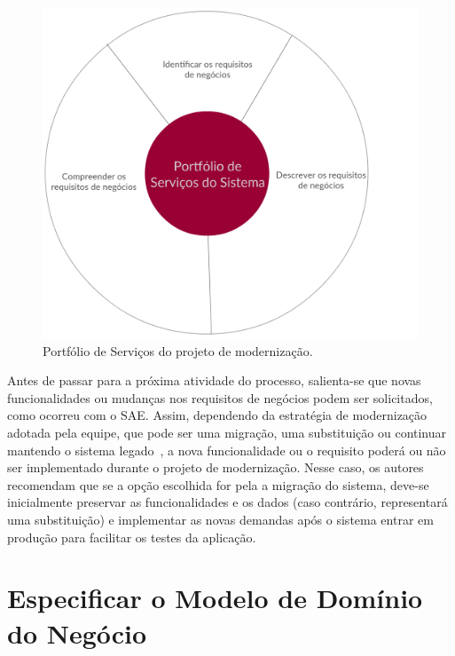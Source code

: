 \begin{figure}[htb]
\centering
\includegraphics[scale=0.30]{img/processo/portfolio_servicos.pdf}
\caption{Portfólio de Serviços do projeto de modernização.}
\label{fig:portfolio_servicos}
\end{figure}


Antes de passar para a próxima atividade do processo, 
salienta-se que novas
funcionalidades ou mudanças nos requisitos de negócios 
podem ser solicitados,
como ocorreu com o \acrshort{SAE}. 
Assim, 
dependendo da estratégia de modernização
adotada pela equipe, que pode ser uma migração, 
uma substituição ou 
continuar mantendo 
o sistema legado~\cite{S3_Bisbal:1999, Seacord:2003, S12_WeidermanApproaches:1997}, 
a nova funcionalidade ou o requisito
poderá ou não ser implementado
durante o projeto de modernização.
Nesse caso, os autores~\cite{S3_Bisbal:1999, Seacord:2003}
recomendam que se a opção escolhida for pela a migração do sistema, 
deve-se inicialmente preservar as funcionalidades e 
os dados (caso contrário, representará uma substituição)
e implementar as novas demandas após 
o sistema entrar em produção para facilitar os testes da aplicação.










\section{Especificar o Modelo de Domínio do Negócio}\label{pro:esp_modelo_dominio}

